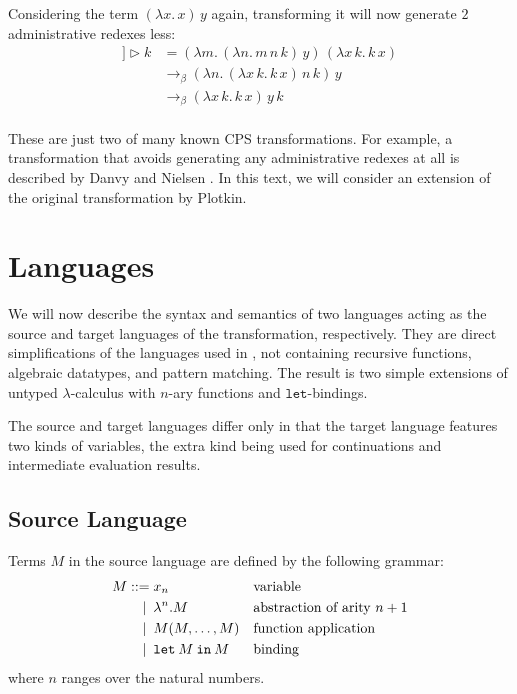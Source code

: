 \documentclass[a4paper,11pt,draft]{article}
\newcommand{\kw}[1]{\mathtt{#1}}
\begin{document}
Considering the term $(\lambda x. \, x) \, y$ again, transforming it will now
generate $2$ administrative redexes less:
\begin{align*}
  [\![(\lambda x. \, x) \, y]\!] \triangleright k &= (\lambda m. \, (\lambda n. \, m \, n \, k) \, y) \, (\lambda x \, k. \, k \, x)\\
                                                  &\rightarrow_{\beta} (\lambda n. \, (\lambda x \, k. \, k \, x) \, n \, k) \, y\\
                                                  &\rightarrow_{\beta} (\lambda x \, k. \, k \, x) \, y \, k
\end{align*}

\paragraph{}

These are just two of many known CPS transformations. For example, a
transformation that avoids generating any administrative redexes at all is
described by Danvy and Nielsen \cite{Danvy-Nielsen-03}. In this text, we
will consider an extension of the original transformation by Plotkin.


\section{Languages}\label{sec:languages}

We will now describe the syntax and semantics of two languages acting as the
source and target languages of the transformation, respectively. They are
direct simplifications of the languages used in \cite{Dargaye-Leroy-07}, not
containing recursive functions, algebraic datatypes, and pattern matching.
The result is two simple extensions of untyped $\lambda$-calculus with $n$-ary
functions and $\kw{let}$-bindings.

The source and target languages differ only in that the target language
features two kinds of variables, the extra kind being used for continuations
and intermediate evaluation results.

\subsection{Source Language}

Terms $M$ in the source language are defined by the following grammar:
\begin{align*}
M ::=             &\; x_{n}
                  && \text{variable} \\
\llap{\textbar\:} &\; \lambda^{n}.M
                  && \text{abstraction of arity $n+1$} \\
\llap{\textbar\:} &\; M(M, \ldots, M)
                  && \text{function application} \\
\llap{\textbar\:} &\; \kw{let} \: M \: \kw{in} \: M
                  && \text{binding}
\end{align*}
where $n$ ranges over the natural numbers.
\end{document}
